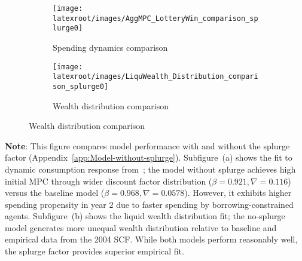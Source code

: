 \documentclass{econsocart}
\begin{document}
\begin{figure}[H]
  \centering
  \caption{Model performance with and without splurge factor}
  \label{fig:splurge0_Norwayestimation} 
  \noindent\begin{minipage}{\textwidth}
    \centering
    \begin{subfigure}[b]{.5\linewidth}
      \centering
      \texttt{[image: \\latexroot/images/AggMPC\_LotteryWin\_comparison\_splurge0]}
      \caption{Spending dynamics comparison}
      \label{fig:aggmpclotterywin_splurge0} 
    \end{subfigure}
    \begin{subfigure}[b]{.5\linewidth}
      \centering
      \texttt{[image: \\latexroot/images/LiquWealth\_Distribution\_comparison\_splurge0]}
      \caption{Wealth distribution comparison}
      \label{fig:liquwealthdistribution_splurge0} 
    \end{subfigure}
  \end{minipage}
\end{figure}
\noindent\parbox{\textwidth}{
  \medskip
  \footnotesize \textbf{Note}: This figure compares model performance with and without the splurge factor (Appendix~\ref{app:Model-without-splurge}).
  Subfigure~(a) shows the fit to dynamic consumption response from~\cite{fagereng-mpc-2021};
  the model without splurge achieves high initial MPC through wider discount factor distribution
  ($\beta = 0.921, \nabla = 0.116$) versus the baseline model ($\beta = 0.968, \nabla = 0.0578$).
  However, it exhibits higher spending propensity in year 2 due to faster spending by borrowing-constrained agents.
  Subfigure~(b) shows the liquid wealth distribution fit; the no-splurge model generates
  more unequal wealth distribution relative to baseline and empirical data from the 2004 SCF.
  While both models perform reasonably well, the splurge factor provides superior empirical fit.
}
\medskip\medskip

\end{document}
